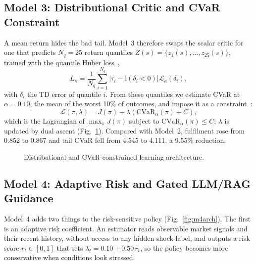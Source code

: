 \documentclass[conference]{IEEEtran}
\begin{document}
\subsection{Model 3: Distributional Critic and CVaR Constraint}
A mean return hides the bad tail. Model~3 therefore swaps the scalar critic for one that predicts $N_q=25$ return quantiles $Z(s)=\{z_1(s),\ldots,z_{25}(s)\}$, trained with the quantile Huber loss~\cite{dabney2018qr},
\begin{equation}
  L_\kappa = \frac{1}{N_q}\sum_{i=1}^{N_q}\left|\tau_i - \mathbb{I}(\delta_i < 0)\right| \mathcal{L}_\kappa(\delta_i),
\end{equation}
with $\delta_i$ the TD error of quantile $i$. From these quantiles we estimate CVaR at $\alpha=0.10$, the mean of the worst 10\% of outcomes, and impose it as a constraint~\cite{chow2014cvar}:
\begin{equation}
  \mathcal{L}(\pi,\lambda) = J(\pi) - \lambda\left(\mathrm{CVaR}_\alpha(\pi) - C\right),
\end{equation}
which is the Lagrangian of $\max_\pi J(\pi)$ subject to $\mathrm{CVaR}_\alpha(\pi)\le C$; $\lambda$ is updated by dual ascent (Fig.~\ref{fig:m3arch}). Compared with Model~2, fulfilment rose from 0.852 to 0.867 and tail CVaR fell from 4.545 to 4.111, a 9.55\% reduction.

\begin{figure}[!t]
\centering
{}
\caption{Distributional and CVaR-constrained learning architecture.}
\label{fig:m3arch}
\end{figure}

\subsection{Model 4: Adaptive Risk and Gated LLM/RAG Guidance}
Model~4 adds two things to the risk-sensitive policy (Fig.~\ref{fig:m4arch}). The first is an adaptive risk coefficient. An estimator reads observable market signals and their recent history, without access to any hidden shock label, and outputs a risk score $r_t\in[0,1]$ that sets $\lambda_t = 0.10 + 0.50\,r_t$, so the policy becomes more conservative when conditions look stressed.
\end{document}
